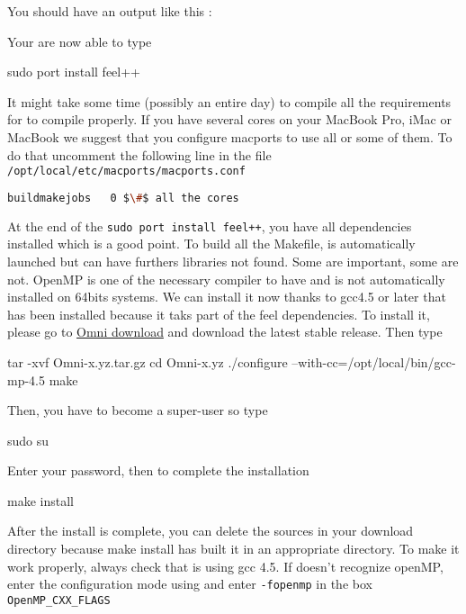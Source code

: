 You should have an output like this :
\begin{flushleft}
\end{flushleft}
Your are now able to type
\begin{unixcom}
		sudo port install feel++
\end{unixcom}
It might take some time (possibly an entire day) to compile all the requirements for \feel
to compile properly. If you have several cores on your MacBook Pro, iMac or MacBook
we suggest that you configure macports to use all or some of them.
To do that uncomment the following line in the file  \lstinline|/opt/local/etc/macports/macports.conf|
\begin{flushleft}
\begin{lstlisting}[language=sh]
buildmakejobs	0 $\#$ all the cores
\end{lstlisting}
\end{flushleft}
At the end of the \lstinline|sudo port install feel++|, you have all
dependencies installed which is a good point. To build all the Makefile, \cmake
is automatically launched but can have furthers libraries not found. Some are
important, some are not. OpenMP is one of the necessary compiler to have and is
not automatically installed on 64bits systems. We can install it now thanks to
gcc4.5 or later that has been installed because it taks part of the feel
dependencies. To install it, please go to
\href{http://www.hpcs.cs.tsukuba.ac.jp/omni-openmp/download/download-omni.html}{Omni
download} and download the latest stable release. Then type
\begin{unixcom}
		tar -xvf Omni-x.yz.tar.gz
		cd  Omni-x.yz
		./configure --with-cc=/opt/local/bin/gcc-mp-4.5
		make
\end{unixcom}
Then, you have to become a super-user so type
\begin{unixcom}
		sudo su
\end{unixcom}
Enter your password, then to complete the installation
\begin{unixcom}
		make install
\end{unixcom}
After the install is complete, you can delete the sources in your download
directory because make install has built it in an appropriate directory. To make
it work properly, always check that \cmake is using gcc 4.5. If \cmake doesn't
recognize openMP, enter the configuration mode using \ccmake and enter
\lstinline|-fopenmp| in the box \lstinline|OpenMP_CXX_FLAGS|

